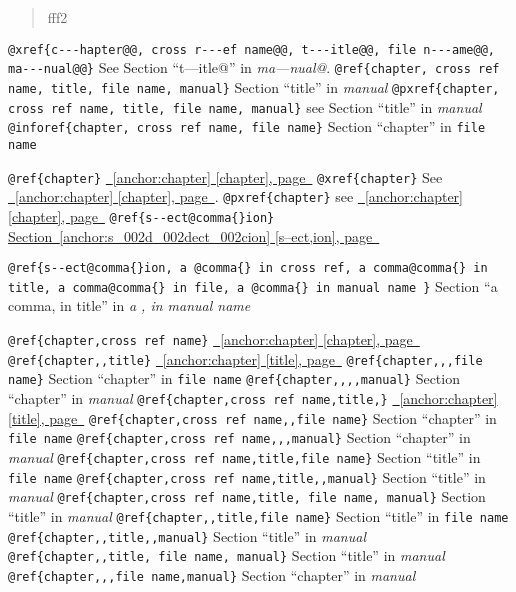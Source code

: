 \documentclass{book}
\begin{document}
%
\begin{quote}
\unskip{\parskip=0pt\noindent}%
fff2
\end{quote}


\texttt{@xref\{c{-}{-}{-}hapter@@, cross r{-}{-}{-}ef name@@, t{-}{-}{-}itle@@, file n{-}{-}{-}ame@@, ma{-}{-}{-}nual@@\}} See Section ``t---itle@'' in \textsl{ma---nual@}.
\texttt{@ref\{chapter, cross ref name, title, file name, manual\}} Section ``title'' in \textsl{manual}
\texttt{@pxref\{chapter, cross ref name, title, file name, manual\}} see Section ``title'' in \textsl{manual}
\texttt{@inforef\{chapter, cross ref name, file name\}} Section ``chapter'' in \texttt{file name}

\texttt{@ref\{chapter\}} \hyperref[anchor:chapter]{\chaptername~\ref*{anchor:chapter} [chapter], page~\pageref*{anchor:chapter}}
\texttt{@xref\{chapter\}} See \hyperref[anchor:chapter]{\chaptername~\ref*{anchor:chapter} [chapter], page~\pageref*{anchor:chapter}}.
\texttt{@pxref\{chapter\}} see \hyperref[anchor:chapter]{\chaptername~\ref*{anchor:chapter} [chapter], page~\pageref*{anchor:chapter}}
\texttt{@ref\{s{-}{-}ect@comma\{\}ion\}} \hyperref[anchor:s_002d_002dect_002cion]{Section~\ref*{anchor:s_002d_002dect_002cion} [s--ect,ion], page~\pageref*{anchor:s_002d_002dect_002cion}}

\texttt{@ref\{s{-}{-}ect@comma\{\}ion, a @comma\{\} in cross
ref, a comma@comma\{\} in title, a comma@comma\{\} in file, a @comma\{\} in manual name \}}
Section ``a comma, in title'' in \textsl{a , in manual name}

\texttt{@ref\{chapter,cross ref name\}} \hyperref[anchor:chapter]{\chaptername~\ref*{anchor:chapter} [chapter], page~\pageref*{anchor:chapter}}
\texttt{@ref\{chapter,,title\}} \hyperref[anchor:chapter]{\chaptername~\ref*{anchor:chapter} [title], page~\pageref*{anchor:chapter}}
\texttt{@ref\{chapter,,,file name\}} Section ``chapter'' in \texttt{file name}
\texttt{@ref\{chapter,,,,manual\}} Section ``chapter'' in \textsl{manual}
\texttt{@ref\{chapter,cross ref name,title,\}} \hyperref[anchor:chapter]{\chaptername~\ref*{anchor:chapter} [title], page~\pageref*{anchor:chapter}}
\texttt{@ref\{chapter,cross ref name,,file name\}} Section ``chapter'' in \texttt{file name}
\texttt{@ref\{chapter,cross ref name,,,manual\}} Section ``chapter'' in \textsl{manual}
\texttt{@ref\{chapter,cross ref name,title,file name\}} Section ``title'' in \texttt{file name}
\texttt{@ref\{chapter,cross ref name,title,,manual\}} Section ``title'' in \textsl{manual}
\texttt{@ref\{chapter,cross ref name,title, file name, manual\}} Section ``title'' in \textsl{manual}
\texttt{@ref\{chapter,,title,file name\}} Section ``title'' in \texttt{file name}
\texttt{@ref\{chapter,,title,,manual\}} Section ``title'' in \textsl{manual}
\texttt{@ref\{chapter,,title, file name, manual\}} Section ``title'' in \textsl{manual}
\texttt{@ref\{chapter,,,file name,manual\}} Section ``chapter'' in \textsl{manual}
\end{document}
